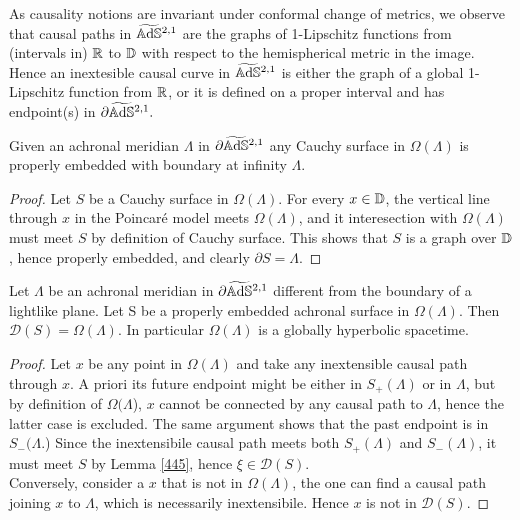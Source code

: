 \begin{observation}
    As causality notions are invariant under conformal change of metrics, we observe that causal paths in $\widetilde{\mathbb{A}\mathrm{d}\mathbb{S}}{}^{2,1}$ are the graphs of 1-Lipschitz functions from (intervals in) $\mathbb{R}$ to $\mathbb{D}$ with respect to the hemispherical metric in the image. Hence an inextesible causal curve in $\widetilde{\mathbb{A}\mathrm{d}\mathbb{S}}{}^{2,1}$ is either the graph of a global 1-Lipschitz function from $\mathbb{R}$, or it is defined on a proper interval and has endpoint(s) in $\partial\widetilde{\mathbb{A}\mathrm{d}\mathbb{S}}{}^{2,1}.$
\end{observation}

\begin{lemma}\label{445}
    Given an achronal meridian $\Lambda$ in $\partial\widetilde{\mathbb{A}\mathrm{d}\mathbb{S}}{}^{2,1}$ any Cauchy surface in $\Omega(\Lambda)$ is properly embedded with boundary at infinity $\Lambda$. 
\end{lemma}
\begin{proof}
    Let $S$ be a Cauchy surface in $\Omega(\Lambda)$. For every $x\in \mathbb{D}$, the vertical line through $x$ in the Poincaré model meets $\Omega(\Lambda)$, and it interesection with $\Omega(\Lambda)$ must meet $S$ by definition of Cauchy surface. This shows that $S$ is a graph over $\mathbb{D}$, hence properly embedded, and clearly $\partial S=\Lambda.$
\end{proof}

\begin{proposition}\label{446}
    Let $\Lambda$ be an achronal meridian in $\partial\widetilde{\mathbb{A}\mathrm{d}\mathbb{S}}{}^{2,1}$ different from the boundary of a lightlike plane. Let S be a properly embedded achronal surface in $\Omega(\Lambda)$. Then $\mathcal{D}(S)=\Omega(\Lambda)$. In particular $\Omega(\Lambda)$ is a globally hyperbolic spacetime.
\end{proposition}
\begin{proof}
    Let $x$ be any point in $\Omega(\Lambda)$ and take any inextensible causal path through $x$. A priori its future endpoint might be either in $S_+(\Lambda)$ or in $\Lambda$, but by definition of $\Omega(\Lambda$), $x$ cannot be connected by any causal path to $\Lambda$, hence the latter case is excluded. The same argument shows that the past endpoint is in $S_-(\Lambda$.) Since the inextensibile causal path meets both $S_+(\Lambda)$ and $S_-(\Lambda)$, it must meet $S$ by Lemma \ref{445}, hence $\xi\in\mathcal{D}(S)$. \\
    Conversely, consider a $x$ that is not in $\Omega(\Lambda)$, the one can find a causal path joining $x$ to $\Lambda$, which is necessarily inextensibile. Hence $x$ is not in $\mathcal{D}(S)$.  
\end{proof}

